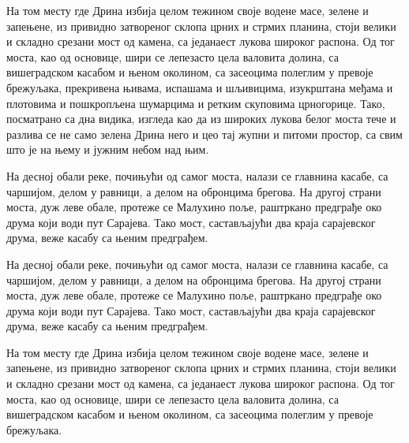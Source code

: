 \documentclass{UUThesisTemplate}
\begin{document}
\begin{serbian}
{\par
На том месту где Дрина избија целом тежином своје водене масе, зелене и запењене, из привидно затвореног склопа црних и стрмих планина, стоји велики и складно срезани мост од камена, са једанаест лукова широког распона. Од тог моста, као од основице, шири се лепезасто цела валовита долина, са вишеградском касабом и њеном околином, са засеоцима полеглим у превоје брежуљака, прекривена њивама, испашама и шљивицима, изукрштана међама и плотовима и пошкропљена шумарцима и ретким скуповима црногорице. Тако, посматрано са дна видика, изгледа као да из широких лукова белог моста тече и разлива се не само зелена Дрина него и цео тај жупни и питоми простор, са свим што је на њему и јужним небом над њим.

\par
На десној обали реке, почињући од самог моста, налази се главнина касабе, са чаршијом, делом у равници, а делом на обронцима брегова. На другој страни моста, дуж леве обале, протеже се Малухино поље, раштркано предграђе око друма који води пут Сарајева. Тако мост, састављајући два краја сарајевског друма, веже касабу са њеним предграђем.

\par
На десној обали реке, почињући од самог моста, налази се главнина касабе, са чаршијом, делом у равници, а делом на обронцима брегова. На другој страни моста, дуж леве обале, протеже се Малухино поље, раштркано предграђе око друма који води пут Сарајева. Тако мост, састављајући два краја сарајевског друма, веже касабу са њеним предграђем.

\par
На том месту где Дрина избија целом тежином своје водене масе, зелене и запењене, из привидно затвореног склопа црних и стрмих планина, стоји велики и складно срезани мост од камена, са једанаест лукова широког распона. Од тог моста, као од основице, шири се лепезасто цела валовита долина, са вишеградском касабом и њеном околином, са засеоцима полеглим у превоје брежуљака.
}
\end{serbian}
\end{document}
